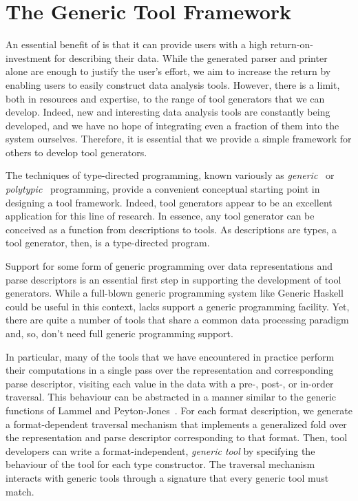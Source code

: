 \section{The Generic Tool Framework}
\label{sec:gen-tool}

An essential benefit of \padsml{} is that it can provide users with a
high return-on-investment for describing their data. While the
generated parser and printer alone are enough to justify the user's
effort, we aim to increase the return by enabling users to easily
construct data analysis tools. However, there is a limit, both in
resources and expertise, to the range of tool generators that we can
develop.  Indeed, new and interesting data analysis tools are
constantly being developed, and we have no hope of integrating even a
fraction of them into the \padsml{} system ourselves. Therefore, it is
essential that we provide a simple framework for others to develop
tool generators.

The techniques of type-directed programming, known variously as
\textit{generic}~\cite{hinze+:generic-programming} or
\textit{polytypic}~\cite{jeuring+:polytypic-programming} programming,
provide a convenient conceptual starting point in designing a tool
framework.  Indeed, tool generators appear to be an excellent
application for this line of research. In essence, any tool generator
can be conceived as a function from descriptions to tools. As
\padsml{} descriptions are types, a tool generator, then, is a
type-directed program.

Support for some form of generic programming over data representations
and parse descriptors is an essential first step in supporting the
development of tool generators. While a full-blown generic programming
system like Generic Haskell~\cite{hinze+:generic-haskell} could be useful in this context, \ocaml{}
lacks support a generic programming facility. Yet, there are quite a
number of tools that share a common data processing paradigm and, so,
don't need full generic programming support.

In particular, many of the tools that we have encountered in practice
perform their computations in a single pass over the representation
and corresponding parse descriptor, visiting each value in the data
with a pre-, post-, or in-order traversal. This behaviour can be
abstracted in a manner similar to the generic functions of Lammel and
Peyton-Jones~\cite{lammel+:syb}. For each format description, we generate a
format-dependent traversal mechanism that implements a generalized
fold over the representation and parse descriptor corresponding to
that format. Then, tool developers can write a format-independent,
\emph{generic tool} by specifying the behaviour of the tool for each
\padsml{} type constructor. The traversal mechanism interacts with
generic tools through a signature that every generic tool must match.

